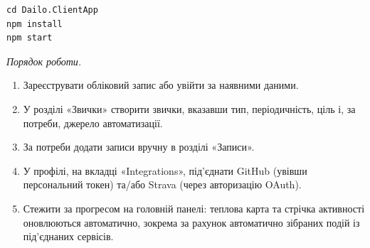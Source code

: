 \begin{lstlisting}[style=nocodeframe]
cd Dailo.ClientApp
npm install
npm start
\end{lstlisting}

\textit{Порядок роботи.}
\begin{enumerate}[noitemsep, topsep=2pt, leftmargin=*, label=\arabic*)]
    \item Зареєструвати обліковий запис або увійти за наявними даними.
    \item У розділі «Звички» створити звички, вказавши тип, періодичність, ціль і, за потреби, джерело автоматизації.
    \item За потреби додати записи вручну в розділі «Записи».
    \item У профілі, на вкладці «Integrations», під'єднати GitHub (увівши персональний токен) та/або Strava (через авторизацію OAuth).
    \item Стежити за прогресом на головній панелі: теплова карта та стрічка активності оновлюються автоматично, зокрема за рахунок автоматично зібраних подій із під'єднаних сервісів.
\end{enumerate}
